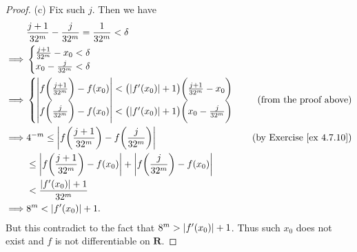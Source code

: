 \begin{proof}{(c)}
    Fix such \(j\).
    Then we have
    \begin{align*}
                 & \frac{j + 1}{32^m} - \frac{j}{32^m} = \frac{1}{32^m} < \delta                                                                                                     \\
        \implies & \begin{cases}
                       \frac{j + 1}{32^m} - x_0 < \delta \\
                       x_0 - \frac{j}{32^m} < \delta
                   \end{cases}                                                                                                                                 \\
        \implies & \begin{cases}
                       \abs*{f\bigg(\frac{j + 1}{32^m}\bigg) - f(x_0)} < \big(\abs*{f'(x_0)} + 1\big) \bigg(\frac{j + 1}{32^m} - x_0\bigg) \\
                       \abs*{f\bigg(\frac{j}{32^m}\bigg) - f(x_0)} < \big(\abs*{f'(x_0)} + 1\big) \bigg(x_0 - \frac{j}{32^m}\bigg)
                   \end{cases} & \text{(from the proof above)}                                           \\
        \implies & 4^{-m} \leq \abs*{f\bigg(\frac{j + 1}{32^m}\bigg) - f\bigg(\frac{j}{32^m}\bigg)}                                           & \text{(by Exercise \ref{ex 4.7.10})} \\
                 & \leq \abs*{f\bigg(\frac{j + 1}{32^m}\bigg) - f(x_0)} + \abs*{f\bigg(\frac{j}{32^m}\bigg) - f(x_0)}                                                                \\
                 & < \frac{\abs*{f'(x_0)} + 1}{32^m}                                                                                                                                 \\
        \implies & 8^m < \abs*{f'(x_0)} + 1.
    \end{align*}
    But this contradict to the fact that \(8^m > \abs*{f'(x_0)} + 1\).
    Thus such \(x_0\) does not exist and \(f\) is not differentiable on \(\mathbf{R}\).
\end{proof}


